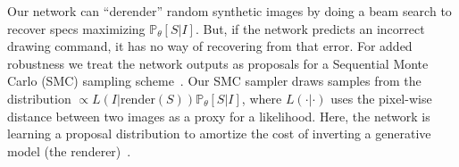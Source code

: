 \documentclass{article}
\newcommand{\probability}{\mathds{P}} %
\theoremstyle{definition}
\begin{document}
Our network can ``derender'' random synthetic images
by doing a beam search to
recover  specs maximizing $\probability_\theta[S|I]$. %
 But, if the network predicts an incorrect
drawing command, it has no way of recovering from that error.  
For added robustness %
we treat the
 network outputs as proposals for a Sequential Monte Carlo (SMC) sampling scheme~\citep{SMCBook}.
Our SMC sampler draws samples
from the distribution $\propto L(I|\text{render}(S))
\probability_\theta[S|I]$, where $L(\cdot | \cdot)$
uses the pixel-wise distance between two images as a proxy for a
likelihood.
Here, the network is learning a proposal distribution to amortize the cost of inverting a generative model (the renderer)~\citep{paige2016inference}.
\end{document}
